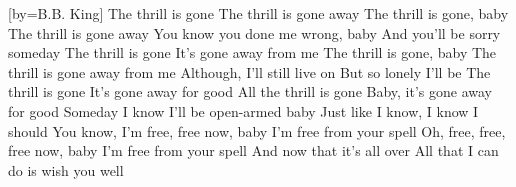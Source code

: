 [by={B.B. King}]
  \beginverse
  The thrill is gone
  The thrill is gone away
  The thrill is gone, baby
  The thrill is gone away
  You know you done me wrong, baby
  And you'll be sorry someday
  \endverse
  \beginverse  
  The thrill is gone
  It's gone away from me
  The thrill is gone, baby
  The thrill is gone away from me
  Although, I'll still live on
  But so lonely I'll be
  \endverse
  \beginverse  
  The thrill is gone
  It's gone away for good
  All the thrill is gone
  Baby, it's gone away for good
  Someday I know I'll be open-armed baby
  Just like I know, I know I should
  \endverse
  \beginverse  
  You know, I'm free, free now, baby
  I'm free from your spell
  Oh, free, free, free now, baby
  I'm free from your spell
  And now that it's all over
  All that I can do is wish you well
  \endverse
\endsong
